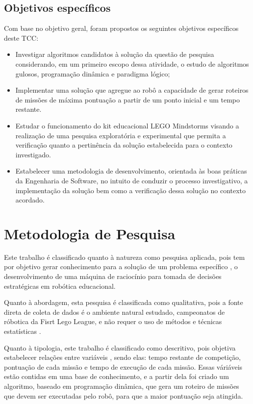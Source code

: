 \subsection{Objetivos específicos}
Com base no objetivo geral, foram propostos os seguintes objetivos específicos deste TCC:
\begin{itemize}
\item Investigar algoritmos candidatos à solução da questão de pesquisa considerando, em um primeiro escopo dessa atividade, o estudo de algoritmos gulosos, programação dinâmica e paradigma lógico;
\item Implementar uma solução que agregue ao robô a capacidade de gerar roteiros de missões de máxima pontuação a partir de um ponto inicial e um tempo restante.
\item Estudar o funcionamento do kit educacional LEGO Mindstorms visando a realização de uma pesquisa exploratória e experimental que permita a verificação quanto a pertinência da solução estabelecida para o contexto investigado.
\item Estabelecer uma metodologia de desenvolvimento, orientada às boas práticas da 	Engenharia de Software, no intuito de conduzir o processo investigativo, a implementação da solução bem como a verificação dessa solução no contexto acordado.
\end{itemize}

\section{Metodologia de Pesquisa}
Este trabalho é classificado quanto à natureza como pesquisa aplicada, pois tem por objetivo gerar conhecimento para a solução de um problema específico \cite{moresi2003metodologia}, o desenvolvimento de uma máquina de raciocínio para tomada de decisões estratégicas em robótica educacional.

Quanto à abordagem, esta pesquisa é classificada como qualitativa, pois a fonte direta de coleta de dados é o ambiente natural estudado, campeonatos de róbotica da Fisrt Lego League, e não requer o uso de métodos e técnicas estatísticas \cite{moresi2003metodologia}.

Quanto à tipologia, este trabalho é classificado como descritivo, pois objetiva estabelecer relações entre variáveis \cite{moresi2003metodologia}, sendo elas: tempo restante de competição, pontuação de cada missão e tempo de execução de cada missão. Essas váriáveis estão contidas em uma base de conhecimento, e a partir dela foi criado um algoritmo, baseado em programação dinâmica, que gera um roteiro de missões que devem ser executadas pelo robô, para que a maior pontuação seja atingida. 

